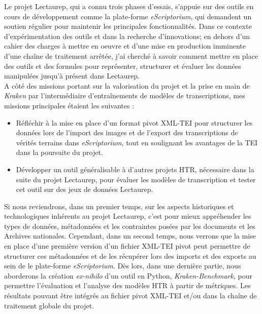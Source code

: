 Le projet Lectaurep, qui a connu trois phases d'essais, s'appuie sur des outils en cours de développement comme la plate-forme \textit{eScriptorium}, qui demandent un soutien régulier pour maintenir les principales fonctionnalités. Dans ce contexte d'expérimentation des outils et dans la recherche d'innovations; en dehors d'un cahier des charges à mettre en oeuvre et d'une mise en production imminente d'une chaîne de traitement arrêtée, j'ai cherché à savoir comment mettre en place des outils et des formules pour représenter, structurer et évaluer les données manipulées jusqu'à présent dans Lectaurep.\\ 

A côté des missions portant sur la valorisation du projet et la prise en main de \textit{Kraken} par l'intermédiaire d'entraînements de modèles de transcriptions, mes missions principales étaient les suivantes : 
\begin{itemize}
    \item Réfléchir à la mise en place d'un format pivot XML-TEI pour structurer les données lors de l'import des images et de l'export des transcriptions de vérités terrains dans \textit{eScriptorium}, tout en soulignant les avantages de la TEI dans la poursuite du projet.
    \item Développer un outil généralisable à d'autres projets HTR, nécessaire dans la suite du projet Lectaurep, pour évaluer les modèles de transcription et tester cet outil sur des jeux de données Lectaurep. 
\end{itemize}

Si nous reviendrons, dans un premier temps, sur les aspects historiques et technologiques inhérents au projet Lectaurep, c'est pour mieux appréhender les types de données, métadonnées et les contraintes posées par les documents et les Archives nationales. Cependant, dans un second temps, nous verrons que la mise en place d'une première version d'un fichier XML-TEI pivot peut permettre de structurer ces métadonnées et de les récupérer lors des imports et des exports au sein de le plate-forme \textit{eScriptorium}. Dès lors, dans une dernière partie, nous aborderons la création \textit{ex-nihilo} d'un outil en Python, \textit{Kraken-Benchmark}, pour permettre l'évaluation et l'analyse des modèles HTR à partir de métriques. Les résultats pouvant être intégrés au fichier pivot XML-TEI et/ou dans la chaîne de traitement globale du projet.


